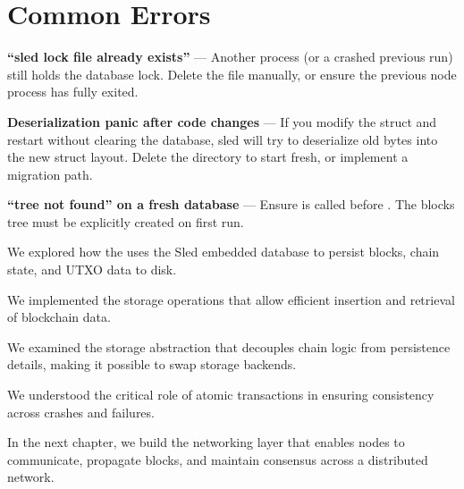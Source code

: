 \section{Common Errors}
\label{sec:ch11-common-errors}

\begin{notebox}
\textbf{``sled lock file already exists''} --- Another process (or a crashed previous run) still holds the database lock. Delete the  file manually, or ensure the previous node process has fully exited.

\textbf{Deserialization panic after code changes} --- If you modify the  struct and restart without clearing the database, sled will try to deserialize old bytes into the new struct layout. Delete the  directory to start fresh, or implement a migration path.

\textbf{``tree not found'' on a fresh database} --- Ensure  is called before . The blocks tree must be explicitly created on first run.
\end{notebox}

\begin{chaptersummary}
\item We explored how the  uses the Sled embedded database to persist blocks, chain state, and UTXO data to disk.
\item We implemented the storage operations that allow efficient insertion and retrieval of blockchain data.
\item We examined the storage abstraction that decouples chain logic from persistence details, making it possible to swap storage backends.
\item We understood the critical role of atomic transactions in ensuring consistency across crashes and failures.
\end{chaptersummary}

In the next chapter, we build the networking layer that enables nodes to communicate, propagate blocks, and maintain consensus across a distributed network.
